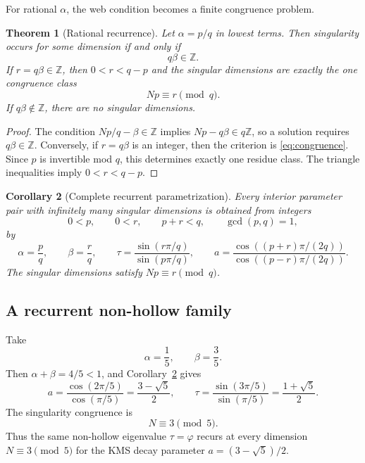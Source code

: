 \documentclass[11pt,reqno]{amsart}
\theoremstyle{plain}
\newtheorem{theorem}{Theorem}
\newtheorem{corollary}[theorem]{Corollary}
\theoremstyle{definition}
\newcommand{\Z}{\mathbb{Z}}
\begin{document}
For rational $\alpha$, the web condition becomes a finite congruence problem.

\begin{theorem}[Rational recurrence]\label{thm:rational}
Let $\alpha=p/q$ in lowest terms.
Then singularity occurs for some dimension if and only if
\begin{equation}\label{eq:compat}
q\beta\in\Z.
\end{equation}
If $r=q\beta\in\Z$, then $0<r<q-p$ and the singular dimensions are exactly the one
congruence class
\begin{equation}\label{eq:congruence}
Np\equiv r\pmod q.
\end{equation}
If $q\beta\notin\Z$, there are no singular dimensions.
\end{theorem}

\begin{proof}
The condition $N p/q-\beta\in\Z$ implies $Np-q\beta\in q\Z$, so a solution requires
$q\beta\in\Z$.  Conversely, if $r=q\beta$ is an integer, then the criterion is
\eqref{eq:congruence}.  Since $p$ is invertible mod $q$, this determines exactly one
residue class.  The triangle inequalities imply $0<r<q-p$.
\end{proof}

\begin{corollary}[Complete recurrent parametrization]\label{cor:param}
Every interior parameter pair with infinitely many singular dimensions is obtained
from integers
\[
0<p,
\qquad 0<r,
\qquad p+r<q,
\qquad \gcd(p,q)=1,
\]
by
\begin{equation}\label{eq:param}
\boxed{
\alpha=\frac pq,
\qquad
\beta=\frac rq,
\qquad
\tau=\frac{\sin(r\pi/q)}{\sin(p\pi/q)},
\qquad
 a=\frac{\cos((p+r)\pi/(2q))}
         {\cos((p-r)\pi/(2q))}.}
\end{equation}
The singular dimensions satisfy $Np\equiv r\pmod q$.
\end{corollary}

\subsection*{A recurrent non-hollow family}
Take
\[
\alpha=\frac15,
\qquad
\beta=\frac35.
\]
Then $\alpha+\beta=4/5<1$, and Corollary~\ref{cor:param} gives
\[
a=\frac{\cos(2\pi/5)}{\cos(\pi/5)}
=\frac{3-\sqrt5}{2},
\qquad
\tau=\frac{\sin(3\pi/5)}{\sin(\pi/5)}
=\frac{1+\sqrt5}{2}.
\]
The singularity congruence is
\[
N\equiv3\pmod5.
\]
Thus the same non-hollow eigenvalue $\tau=\varphi$ recurs at every dimension
$N\equiv3\pmod5$ for the KMS decay parameter $a=(3-\sqrt5)/2$.
\end{document}
